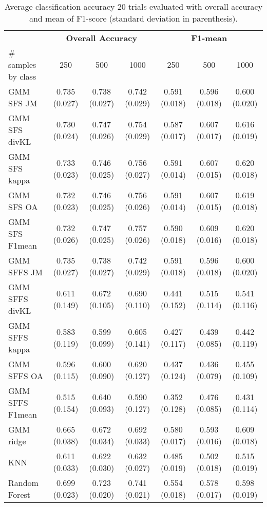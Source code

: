 \documentclass[a4paper,10pt,DIV=16]{scrartcl}
\begin{document}
    \begin{table}[!t]
        \centering
        \caption{Average classification accuracy 20 trials evaluated with overall accuracy and mean of F1-score (standard deviation in parenthesis).\label{tab:aisa-otbsimu-othereval}}
        \begin{tabular}{lcccccc}\toprule
             & \multicolumn{3}{c}{\bfseries Overall Accuracy} & \multicolumn{3}{c}{\bfseries F1-mean} \\ \cmidrule{2-7}
            \# samples by class & 250 & 500 & 1000  & 250 & 500 & 1000 \\ \midrule

            GMM SFS JM &      0.735 (0.027) & 0.738 (0.027) & 0.742 (0.029) & 0.591 (0.018) & 0.596 (0.018) & 0.600 (0.020) \\
            GMM SFS divKL &   0.730 (0.024) & 0.747 (0.026) & 0.754 (0.029) & 0.587 (0.017) & 0.607 (0.017) & 0.616 (0.019) \\
            GMM SFS kappa &   0.733 (0.023) & 0.746 (0.025) & 0.756 (0.027) & 0.591 (0.014) & 0.607 (0.015) & 0.620 (0.018) \\
            GMM SFS OA &      0.732 (0.023) & 0.746 (0.025) & 0.756 (0.026) & 0.591 (0.014) & 0.607 (0.015) & 0.619 (0.018) \\
            GMM SFS F1mean &  0.732 (0.026) & 0.747 (0.025) & 0.757 (0.026) & 0.590 (0.018) & 0.609 (0.016) & 0.620 (0.018) \\
            GMM SFFS JM &     0.735 (0.027) & 0.738 (0.027) & 0.742 (0.029) & 0.591 (0.018) & 0.596 (0.018) & 0.600 (0.020) \\
            GMM SFFS divKL &  0.611 (0.149) & 0.672 (0.105) & 0.690 (0.110) & 0.441 (0.152) & 0.515 (0.114) & 0.541 (0.116) \\
            GMM SFFS kappa &  0.583 (0.119) & 0.599 (0.099) & 0.605 (0.141) & 0.427 (0.117) & 0.439 (0.085) & 0.442 (0.119) \\
            GMM SFFS OA &     0.596 (0.115) & 0.600 (0.090) & 0.620 (0.127) & 0.437 (0.124) & 0.436 (0.079) & 0.455 (0.109) \\
            GMM SFFS F1mean & 0.515 (0.154) & 0.640 (0.093) & 0.590 (0.127) & 0.352 (0.128) & 0.476 (0.085) & 0.431 (0.114) \\
            GMM ridge &       0.665 (0.038) & 0.672 (0.034) & 0.692 (0.033) & 0.580 (0.017) & 0.593 (0.016) & 0.609 (0.018) \\
            KNN &             0.611 (0.033) & 0.622 (0.030) & 0.632 (0.027) & 0.485 (0.019) & 0.502 (0.018) & 0.515 (0.019) \\
            Random Forest &   0.699 (0.023) & 0.723 (0.020) & 0.741 (0.021) & 0.554 (0.018) & 0.578 (0.017) & 0.598 (0.019) \\
            \bottomrule
        \end{tabular}
    \end{table}
\end{document}
